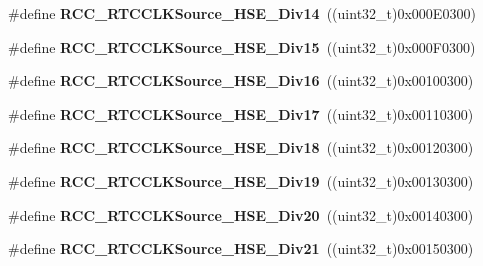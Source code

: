 \begin{DoxyCompactItemize}
\#define {\bfseries R\+C\+C\+\_\+\+R\+T\+C\+C\+L\+K\+Source\+\_\+\+H\+S\+E\+\_\+\+Div14}~((uint32\+\_\+t)0x000\+E0300)
\item 
\mbox{\label{group___r_c_c___r_t_c___clock___source_ga45b090cdf72a82566317d150ba6b2d94}} 
\#define {\bfseries R\+C\+C\+\_\+\+R\+T\+C\+C\+L\+K\+Source\+\_\+\+H\+S\+E\+\_\+\+Div15}~((uint32\+\_\+t)0x000\+F0300)
\item 
\mbox{\label{group___r_c_c___r_t_c___clock___source_gacf80598de73f9291825e3ef005e547c3}} 
\#define {\bfseries R\+C\+C\+\_\+\+R\+T\+C\+C\+L\+K\+Source\+\_\+\+H\+S\+E\+\_\+\+Div16}~((uint32\+\_\+t)0x00100300)
\item 
\mbox{\label{group___r_c_c___r_t_c___clock___source_gaa76bd0695de9e4eb1f305139cabe060a}} 
\#define {\bfseries R\+C\+C\+\_\+\+R\+T\+C\+C\+L\+K\+Source\+\_\+\+H\+S\+E\+\_\+\+Div17}~((uint32\+\_\+t)0x00110300)
\item 
\mbox{\label{group___r_c_c___r_t_c___clock___source_ga1b2330908760ff93d2e1f182aec7b2a1}} 
\#define {\bfseries R\+C\+C\+\_\+\+R\+T\+C\+C\+L\+K\+Source\+\_\+\+H\+S\+E\+\_\+\+Div18}~((uint32\+\_\+t)0x00120300)
\item 
\mbox{\label{group___r_c_c___r_t_c___clock___source_gac5f573747c2aeb34a6e9f85b63aa4b8a}} 
\#define {\bfseries R\+C\+C\+\_\+\+R\+T\+C\+C\+L\+K\+Source\+\_\+\+H\+S\+E\+\_\+\+Div19}~((uint32\+\_\+t)0x00130300)
\item 
\mbox{\label{group___r_c_c___r_t_c___clock___source_ga13f9efb214ab991881957131a1515edb}} 
\#define {\bfseries R\+C\+C\+\_\+\+R\+T\+C\+C\+L\+K\+Source\+\_\+\+H\+S\+E\+\_\+\+Div20}~((uint32\+\_\+t)0x00140300)
\item 
\mbox{\label{group___r_c_c___r_t_c___clock___source_gaa53d1955e045f1abf0b8416afb9dd30a}} 
\#define {\bfseries R\+C\+C\+\_\+\+R\+T\+C\+C\+L\+K\+Source\+\_\+\+H\+S\+E\+\_\+\+Div21}~((uint32\+\_\+t)0x00150300)
\item 
\mbox{\label{group___r_c_c___r_t_c___clock___source_gad73953ea82b2d088763a2f6a73ef3eb9}} 

\end{DoxyCompactItemize}
